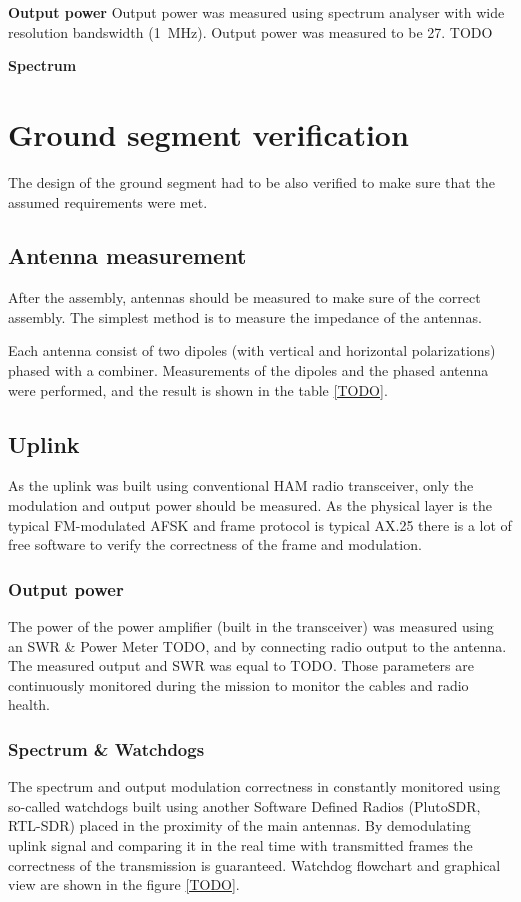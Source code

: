 \textbf{Output power}
Output power was measured using spectrum analyser with wide resolution bandswidth (\SI{1}{\MHz}). Output power was measured to be \SI{27}{\dBm}. TODO

\textbf{Spectrum}



\section{Ground segment verification}
The design of the ground segment had to be also verified to make sure that the assumed requirements were met.

\subsection{Antenna measurement}
After the assembly, antennas should be measured to make sure of the correct assembly. The simplest method is to measure the impedance of the antennas.

Each antenna consist of two dipoles (with vertical and horizontal polarizations) phased with a combiner. Measurements of the dipoles and the phased antenna were performed, and the result is shown in the table \ref{TODO}.


\subsection{Uplink}
As the uplink was built using conventional HAM radio transceiver, only the modulation and output power should be measured. As the physical layer is the typical FM-modulated AFSK and frame protocol is typical AX.25 there is a lot of free software to verify the correctness of the frame and modulation.

\subsubsection{Output power}
The power of the power amplifier (built in the transceiver) was measured using an SWR \& Power Meter TODO, and by connecting radio output to the antenna. The measured output and SWR was equal to TODO. Those parameters are continuously monitored during the mission to monitor the cables and radio health.

\subsubsection{Spectrum \& Watchdogs}
The spectrum and output modulation correctness in constantly monitored using so-called watchdogs built using another Software Defined Radios (PlutoSDR, RTL-SDR) placed in the proximity of the main antennas.
By demodulating uplink signal and comparing it in the real time with transmitted frames the correctness of the transmission is guaranteed. Watchdog flowchart and graphical view are shown in the figure \ref{TODO}.



